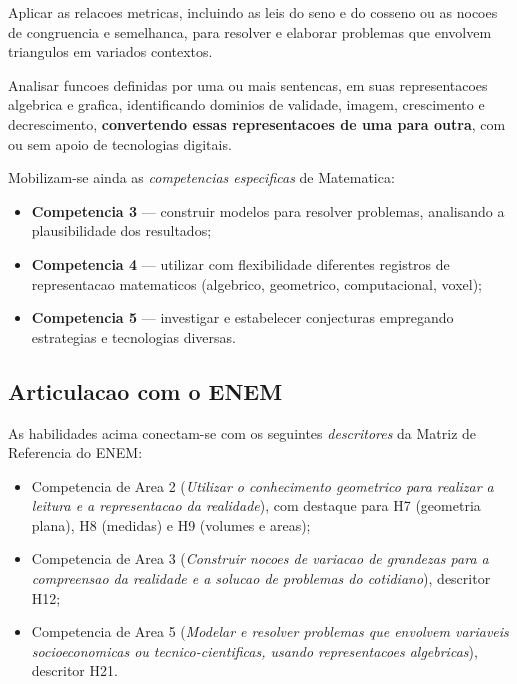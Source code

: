 \documentclass[12pt,a4paper]{scrartcl}
\newcommand{\acc}[1]{\textcolor{accent}{\textbf{#1}}}
\begin{document}
\begin{habilidade}[EM13MAT308]
Aplicar as relacoes metricas, incluindo as leis do seno e do cosseno ou as nocoes de congruencia e semelhanca, para resolver e elaborar problemas que envolvem triangulos em variados contextos.
\end{habilidade}

\begin{habilidade}[EM13MAT404]
Analisar funcoes definidas por uma ou mais sentencas, em suas representacoes algebrica e grafica, identificando dominios de validade, imagem, crescimento e decrescimento, \acc{convertendo essas representacoes de uma para outra}, com ou sem apoio de tecnologias digitais.
\end{habilidade}

\medskip
Mobilizam-se ainda as \emph{competencias especificas} de Matematica:

\begin{itemize}[leftmargin=1.3em,itemsep=0.15em,topsep=0.3em]
  \item \acc{Competencia 3} --- construir modelos para resolver problemas, analisando a plausibilidade dos resultados;
  \item \acc{Competencia 4} --- utilizar com flexibilidade diferentes registros de representacao matematicos (algebrico, geometrico, computacional, voxel);
  \item \acc{Competencia 5} --- investigar e estabelecer conjecturas empregando estrategias e tecnologias diversas.
\end{itemize}

\subsection{Articulacao com o ENEM}\label{sec:enem}

As habilidades acima conectam-se com os seguintes \emph{descritores} da Matriz de Referencia do ENEM:

\begin{itemize}[leftmargin=1.3em,itemsep=0.15em,topsep=0.3em]
  \item Competencia de Area 2 (\emph{Utilizar o conhecimento geometrico para realizar a leitura e a representacao da realidade}), com destaque para H7 (geometria plana), H8 (medidas) e H9 (volumes e areas);
  \item Competencia de Area 3 (\emph{Construir nocoes de variacao de grandezas para a compreensao da realidade e a solucao de problemas do cotidiano}), descritor H12;
  \item Competencia de Area 5 (\emph{Modelar e resolver problemas que envolvem variaveis socioeconomicas ou tecnico-cientificas, usando representacoes algebricas}), descritor H21.
\end{itemize}
\end{document}
